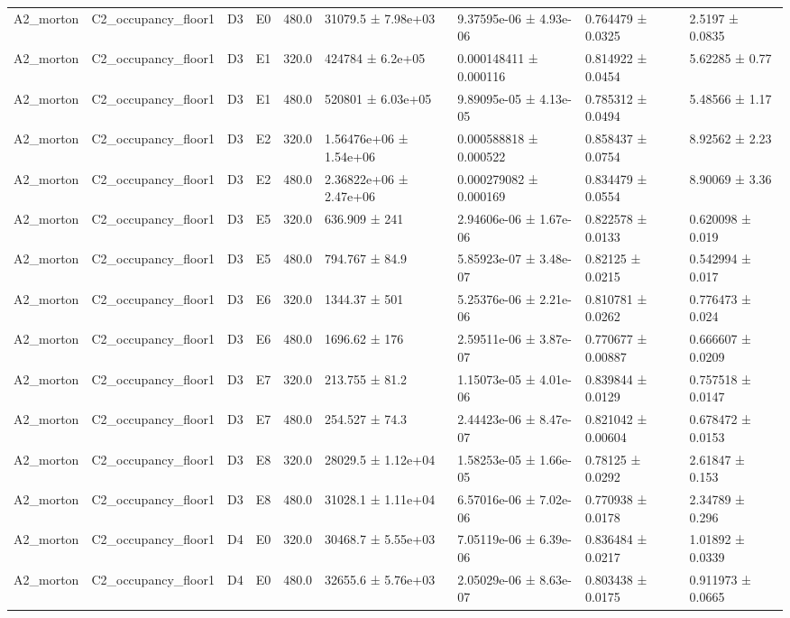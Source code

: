 \begin{table}
\begin{tabular}{lllllllll}
A2\_morton & C2\_occupancy\_floor1 & D3 & E0 & 480.0 & 31079.5 ± 7.98e+03 & 9.37595e-06 ± 4.93e-06 & 0.764479 ± 0.0325 & 2.5197 ± 0.0835 \\
A2\_morton & C2\_occupancy\_floor1 & D3 & E1 & 320.0 & 424784 ± 6.2e+05 & 0.000148411 ± 0.000116 & 0.814922 ± 0.0454 & 5.62285 ± 0.77 \\
A2\_morton & C2\_occupancy\_floor1 & D3 & E1 & 480.0 & 520801 ± 6.03e+05 & 9.89095e-05 ± 4.13e-05 & 0.785312 ± 0.0494 & 5.48566 ± 1.17 \\
A2\_morton & C2\_occupancy\_floor1 & D3 & E2 & 320.0 & 1.56476e+06 ± 1.54e+06 & 0.000588818 ± 0.000522 & 0.858437 ± 0.0754 & 8.92562 ± 2.23 \\
A2\_morton & C2\_occupancy\_floor1 & D3 & E2 & 480.0 & 2.36822e+06 ± 2.47e+06 & 0.000279082 ± 0.000169 & 0.834479 ± 0.0554 & 8.90069 ± 3.36 \\
A2\_morton & C2\_occupancy\_floor1 & D3 & E5 & 320.0 & 636.909 ± 241 & 2.94606e-06 ± 1.67e-06 & 0.822578 ± 0.0133 & 0.620098 ± 0.019 \\
A2\_morton & C2\_occupancy\_floor1 & D3 & E5 & 480.0 & 794.767 ± 84.9 & 5.85923e-07 ± 3.48e-07 & 0.82125 ± 0.0215 & 0.542994 ± 0.017 \\
A2\_morton & C2\_occupancy\_floor1 & D3 & E6 & 320.0 & 1344.37 ± 501 & 5.25376e-06 ± 2.21e-06 & 0.810781 ± 0.0262 & 0.776473 ± 0.024 \\
A2\_morton & C2\_occupancy\_floor1 & D3 & E6 & 480.0 & 1696.62 ± 176 & 2.59511e-06 ± 3.87e-07 & 0.770677 ± 0.00887 & 0.666607 ± 0.0209 \\
A2\_morton & C2\_occupancy\_floor1 & D3 & E7 & 320.0 & 213.755 ± 81.2 & 1.15073e-05 ± 4.01e-06 & 0.839844 ± 0.0129 & 0.757518 ± 0.0147 \\
A2\_morton & C2\_occupancy\_floor1 & D3 & E7 & 480.0 & 254.527 ± 74.3 & 2.44423e-06 ± 8.47e-07 & 0.821042 ± 0.00604 & 0.678472 ± 0.0153 \\
A2\_morton & C2\_occupancy\_floor1 & D3 & E8 & 320.0 & 28029.5 ± 1.12e+04 & 1.58253e-05 ± 1.66e-05 & 0.78125 ± 0.0292 & 2.61847 ± 0.153 \\
A2\_morton & C2\_occupancy\_floor1 & D3 & E8 & 480.0 & 31028.1 ± 1.11e+04 & 6.57016e-06 ± 7.02e-06 & 0.770938 ± 0.0178 & 2.34789 ± 0.296 \\
A2\_morton & C2\_occupancy\_floor1 & D4 & E0 & 320.0 & 30468.7 ± 5.55e+03 & 7.05119e-06 ± 6.39e-06 & 0.836484 ± 0.0217 & 1.01892 ± 0.0339 \\
A2\_morton & C2\_occupancy\_floor1 & D4 & E0 & 480.0 & 32655.6 ± 5.76e+03 & 2.05029e-06 ± 8.63e-07 & 0.803438 ± 0.0175 & 0.911973 ± 0.0665 \\

\end{tabular}
\end{table}
